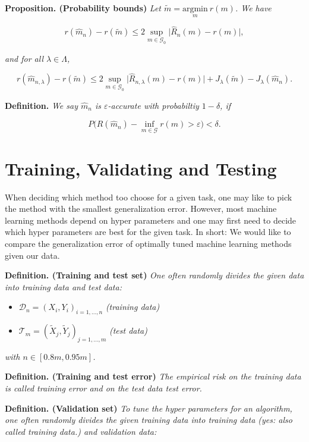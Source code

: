 \documentclass[a4paper,10pt,openany]{book}
\providecommand{\tightlist}{%
 \setlength{\itemsep}{0pt}\setlength{\parskip}{0pt}}
\begin{document}
\textbf{Proposition. (Probability bounds)} \emph{Let \(\tilde{m}=\underset{m}{\text{argmin}}\ r(m)\). We have}

\[
r(\hat{m}_n)-r(\tilde{m})\le 2\sup_{m\in\mathcal{G}_0}\Big\vert\hat{R}_n(m) - r(m) \Big\vert,
\]

\emph{and for all \(\lambda \in \Lambda\),}

\[
r(\hat{m}_{n,\lambda})-r(\tilde{m})\le 2\sup_{m\in\mathcal{G}_0}\Big\vert\hat{R}_{n,\lambda}(m) - r(m) \Big\vert + J_\lambda(\tilde{m})-J_\lambda(\hat{m}_n).
\]

\textbf{Definition.} \emph{We say \(\hat{m}_n\) is \(\varepsilon\)-accurate with probabiltiy \(1-\delta\), if}

\[
P\Big(R(\hat{m}_n)-\inf_{m\in\mathcal{G}}r(m)>\varepsilon\Big)<\delta.
\]

\hypertarget{training-validating-and-testing}{%
\section{Training, Validating and Testing}\label{training-validating-and-testing}}

When deciding which method too choose for a given task, one may like to pick the method with the smallest generalization error. However, most machine learning methods depend on hyper parameters and one may first need to decide which hyper parameters are best for the given task. In short: We would like to compare the generalization error of optimally tuned machine learning methods given our data.

\textbf{Definition. (Training and test set)} \emph{One often randomly divides the given data into training data and test data:}

\begin{itemize}
\tightlist
\item
  \(\mathcal{D}_n=(X_i,Y_i)_{i=1,...,n}\) \emph{(training data)}
\item
  \(\mathcal{T}_m=(\tilde{X}_j,\tilde{Y}_j)_{j=1,...,m}\) \emph{(test data)}
\end{itemize}

\emph{with \(n\in[0.8m,0.95m]\).}

\textbf{Definition. (Training and test error)} \emph{The empirical risk on the training data is called training error and on the test data test error.}

\textbf{Definition. (Validation set)} \emph{To tune the hyper parameters for an algorithm, one often randomly divides the given training data into training data (yes: also called training data.) and validation data:}
\end{document}
